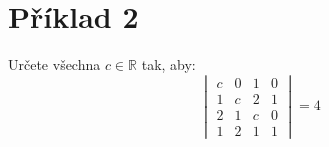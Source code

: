 \section*{Příklad 2}
Určete všechna $c \in \mathbb{R}$ tak, aby:
$$
\begin{vmatrix}
  c & 0 & 1 & 0 \\
  1 & c & 2 & 1 \\
  2 & 1 & c & 0 \\
  1 & 2 & 1 & 1
\end{vmatrix}
= 4
$$
